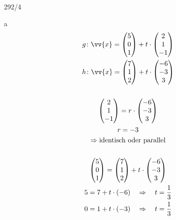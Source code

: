 \begin{exercise}{292/4}
  \item [a]
  \begin{gather*}
    g \colon \vv{x} = \begin{pmatrix}5 \\ 0 \\ 1\end{pmatrix} + t \cdot \begin{pmatrix}2 \\ 1 \\ -1\end{pmatrix} \\
    h \colon \vv{x} = \begin{pmatrix}7 \\ 1 \\ 2\end{pmatrix} + t \cdot \begin{pmatrix}-6 \\ -3 \\ 3\end{pmatrix} \\\\
    \begin{pmatrix}2 \\ 1 \\ -1\end{pmatrix} = r \cdot \begin{pmatrix}-6 \\ -3 \\ 3\end{pmatrix} \\
    r = -3 \\
    \Rightarrow \text{identisch oder parallel} \\\\
    \begin{pmatrix}5 \\ 0 \\ 1\end{pmatrix} = \begin{pmatrix}7 \\ 1 \\ 2\end{pmatrix} + t \cdot \begin{pmatrix}-6 \\ -3 \\ 3\end{pmatrix} \\
    5 = 7 + t \cdot (-6) \quad\Rightarrow\quad t = \frac{1}{3} \\
    0 = 1 + t \cdot (-3) \quad\Rightarrow\quad t = \frac{1}{3} \\

\end{gather*}
\end{exercise}
